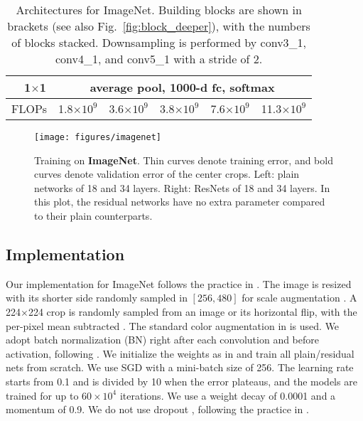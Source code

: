 \begin{table*}[t]
\begin{center}
{\begin{tabular}{c|c|c|c|c|c|c}
\hline
& 1$\times$1  & \multicolumn{5}{c}{average pool, 1000-d fc, softmax} \\
\hline
\multicolumn{2}{c|}{FLOPs} & 1.8$\times10^9$  & 3.6$\times10^9$  & 3.8$\times10^9$  & 7.6$\times10^9$  & 11.3$\times10^9$ \\
\hline
\end{tabular}
}
\end{center}
\vspace{-.5em}
\caption{Architectures for ImageNet. Building blocks are shown in brackets (see also Fig.~\ref{fig:block_deeper}), with the numbers of blocks stacked. Downsampling is performed by conv3\_1, conv4\_1, and conv5\_1 with a stride of 2.
}
\label{tab:arch}
\vspace{-.5em}
\end{table*}

\begin{figure*}[t]
\begin{center}
\texttt{[image: figures/imagenet]}
\end{center}
\vspace{-1.2em}
\caption{Training on \textbf{ImageNet}. Thin curves denote training error, and bold curves denote validation error of the center crops. Left: plain networks of 18 and 34 layers. Right: ResNets of 18 and 34 layers. In this plot, the residual networks have no extra parameter compared to their plain counterparts.}
\label{fig:imagenet}
\end{figure*}

\subsection{Implementation}
\label{sec:impl}

Our implementation for ImageNet follows the practice in \cite{Krizhevsky2012,Simonyan2015}. The image is resized with its shorter side randomly sampled in $[256, 480]$ for scale augmentation \cite{Simonyan2015}. A 224$\times$224 crop is randomly sampled from an image or its horizontal flip, with the per-pixel mean subtracted \cite{Krizhevsky2012}. The standard color augmentation in \cite{Krizhevsky2012} is used.
We adopt batch normalization (BN) \cite{Ioffe2015} right after each convolution and before activation, following \cite{Ioffe2015}.
We initialize the weights as in \cite{He2015} and train all plain/residual nets from scratch.
We use SGD with a mini-batch size of 256. The learning rate starts from 0.1 and is divided by 10 when the error plateaus, and the models are trained for up to $60\times10^4$ iterations. We use a weight decay of 0.0001 and a momentum of 0.9. We do not use dropout \cite{Hinton2012}, following the practice in \cite{Ioffe2015}.

